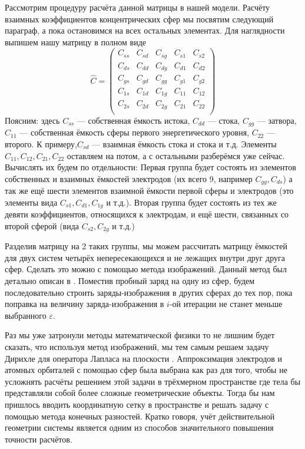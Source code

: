 \documentclass[12pt,a4paper]{report}
\begin{document}
Рассмотрим процедуру расчёта данной матрицы в нашей модели. Расчёту взаимных коэффициентов концентрических сфер мы посвятим следующий параграф, а пока остановимся на всех остальных элементах.
Для наглядности выпишем нашу матрицу в полном виде
\begin{equation}
\hat C = \begin{pmatrix}
C_{ss}& C_{sd}& C_{sg}& C_{s1}& C_{s2}\\
C_{ds}& C_{dd}& C_{dg}& C_{d1}& C_{d2}\\
C_{gs}& C_{gd}& C_{gg}& C_{g1}& C_{g2}\\
C_{1s}& C_{1d}& C_{1g}& C_{11}& C_{12}\\
C_{2s}& C_{2d}& C_{2g}& C_{21}& C_{22}\\
\end{pmatrix}
\end{equation}
Поясним: здесь $C_{ss}$ — собственная ёмкость истока, $C_{dd}$ — стока, $C_{gg}$ — затвора, $C_{11}$ — собственная ёмкость сферы первого энергетического уровня, $C_{22}$ — второго. К примеру,$C_{sd}$ — взаимная ёмкость стока и стока и т.д. Элементы $C_{11}, C_{12}, C_{21}, C_{22}$ оставляем на потом, а с остальными разберёмся уже сейчас. Вычислять их будем по отдельности: Первая группа будет состоять из элементов собственных и взаимных ёмкостей электродов (их всего 9, например $C_{gg}, C_{ds}$) а так же ещё шести элементов взаимной ёмкости первой сферы и электродов (это элементы вида $C_{s1}, C_{d1}, C_{1g}$ и т.д.). Вторая группа будет состоять из тех же девяти коэффициентов, относящихся к электродам, и ещё шести, связанных со второй сферой (вида $C_{s2}, C_{2g}$ и т.д.)

Разделив матрицу на 2 таких группы, мы можем рассчитать матрицу ёмкостей для двух систем четырёх непересекающихся и не лежащих внутри друг друга сфер. Сделать это можно с помощью метода изображений. Данный метод был детально описан в \cite{Landau}. Поместив пробный заряд на одну из сфер, будем последовательно строить заряды-изображения в других сферах до тех пор, пока поправка на величину заряда-изображения в $i$-ой итерации не станет меньше выбранного $\varepsilon$.

Раз мы уже затронули методы математической физики то не лишним будет сказать, что используя метод изображений, мы тем самым решаем задачу Дирихле для оператора Лапласа на плоскости \cite{MMF}. Аппроксимация электродов и атомных орбиталей с помощью сфер была выбрана как раз для того, чтобы не усложнять расчёты решением этой задачи в трёхмерном пространстве где тела бы представляли собой более сложные геометрические объекты. Тогда бы нам пришлось вводить координатную сетку в пространстве и решать задачу с помощью метода конечных разностей. Кратко говоря, учёт действительной геометрии системы является одним из способов значительного повышения точности расчётов.
\end{document}
